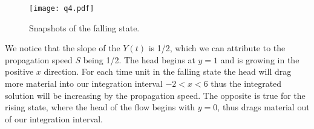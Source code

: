\documentclass{article}
\begin{document}
\begin{homeworkProblem}

    \begin{figure}[!ht]
    \begin{center}
        
        \texttt{[image: q4.pdf]}

        \caption{\label{fig:q4} Snapshots of the falling state.}

    \end{center}
    \end{figure}

    We notice that the slope of the $Y(t)$ is 1/2, which we can attribute to
    the propagation speed $S$ being 1/2. The head begins at $y = 1$ and is
    growing in the positive $x$ direction. For each time unit in the falling
    state the head will drag more material into our integration interval $-2 <
    x < 6$ thus the integrated solution will be increasing by the propagation
    speed. The opposite is true for the rising state, where the head of the
    flow begins with $y = 0$, thus drags material out of our integration
    interval.

\end{homeworkProblem} \clearpage
\end{document}
